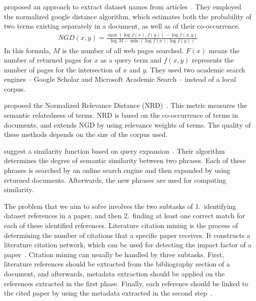 \documentclass{IOS-Book-Article}
\begin{document}
\citeauthor{sighal2013} proposed an approach to extract dataset names from articles~\citeyearpar{sighal2013}.
They employed the normalized google distance %
algorithm, which estimates both the probability of two terms existing separately in a document, as well as of their co-occurrence. 
\begin{align*}
	\mathit{NGD}(x,y)=\frac{\max(\log f(x),f(y))-\log f(x,y)}{\log M -\min(\log f(x),\log f(y))}
\end{align*}
In this formula, $M$ is the number of all web pages searched.
$F(x)$ means the number of returned pages for $x$ as a query term and $f(x,y)$ represents the number of pages for the intersection of $x$ and $y$. 
They used two academic search engines -- Google Scholar and Microsoft Academic Search -- instead of a local corpus.

\citeauthor{Schaefer2014} proposed the Normalized Relevance Distance (NRD)~\citeyearpar{Schaefer2014}.
This metric measures the semantic relatedness of terms.
NRD is based on the co-occurrence of terms in documents, and extends NGD by using relevance weights of terms.
The quality of these methods depends on the size of the corpus used.

\citeauthor{Sahami2006} suggest a similarity function based on query expansion~\citeyearpar{Sahami2006}.
Their algorithm determines the degree of semantic similarity between two phrases.
Each of these phrases is searched by an online search engine and then expanded by using returned documents.
Afterwards, the new phrases are used for computing similarity. 

The problem that we aim to solve involves the two subtasks of 1.\ identifying dataset references in a paper, and then 2.\ finding at least one correct match for each of these identified references.
Literature citation mining is the process of determining the number of citations that a specific paper receives.
It constructs a literature citation network, which can be used for detecting the 
impact factor of a paper~\cite{Afzal2010}.
Citation mining can usually be handled by three subtasks.
First, literature references should be extracted from the bibliography section of a document, and afterwards, metadata extraction should be applied on the references extracted in the first phase.
Finally, each reference should be linked to the cited paper by using the metadata extracted in the second step~\cite{Afzal2010}.
\end{document}
